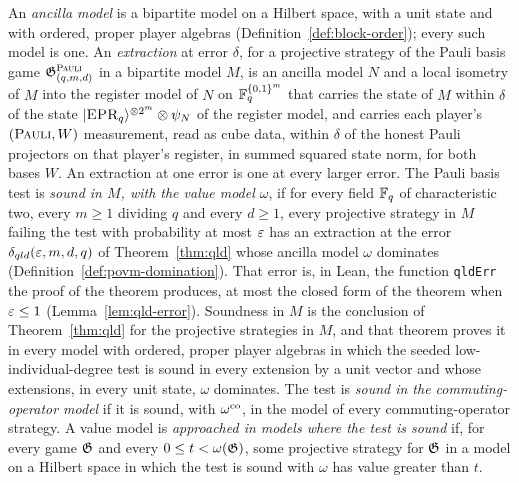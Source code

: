 \begin{definition}
\label{def:qld-sound-in}
\leanok
An \emph{ancilla model} is a bipartite model on a Hilbert space, with a unit state and with ordered,
proper player algebras (Definition~\ref{def:block-order}); every such model is one. An
\emph{extraction} at error $\delta$, for a projective strategy of the Pauli basis game
$\mathfrak{G}^{\textsc{Pauli}}_{(q,m,d)}$ in a bipartite model $M$, is an ancilla model $N$ and a local isometry of
$M$ into the register model of $N$ on $\mathbb{F}_q^{\{0,1\}^m}$ that carries the state of $M$ within
$\delta$ of the state $|\textsc{EPR}_q\rangle^{\otimes 2^m} \otimes \psi_N$ of the register model, and carries each
player's $(\textsc{Pauli}, W)$ measurement, read as cube data, within $\delta$ of the honest Pauli
projectors on that player's register, in summed squared state norm, for both bases $W$. An
extraction at one error is one at every larger error. The Pauli basis test is \emph{sound in $M$,
with the value model $\omega$}, if for every field $\mathbb{F}_q$ of characteristic two, every $m \geq 1$
dividing $q$ and every $d \geq 1$, every projective strategy in $M$ failing the test with
probability at most $\varepsilon$ has an extraction at the error $\delta_{qld}(\varepsilon, m, d, q)$ of
Theorem~\ref{thm:qld} whose ancilla model $\omega$ dominates (Definition~\ref{def:povm-domination}).
That error is, in Lean, the function \texttt{qldErr} the proof of the theorem produces, at most the
closed form of the theorem when $\varepsilon \leq 1$ (Lemma~\ref{lem:qld-error}). Soundness in $M$ is the conclusion of
Theorem~\ref{thm:qld} for the projective strategies in $M$, and that theorem proves it in every
model with ordered, proper player algebras in which the seeded low-individual-degree test is sound
in every extension by a unit vector and whose extensions, in every unit state, $\omega$ dominates.
The test is \emph{sound in the commuting-operator model} if it is sound, with $\omega^{\mathrm{co}}$, in the
model of every commuting-operator strategy. A value model is \emph{approached in models where the
test is sound} if, for every game $\mathfrak{G}$ and every $0 \leq t < \omega(\mathfrak{G})$, some projective
strategy for $\mathfrak{G}$ in a model on a Hilbert space in which the test is sound with $\omega$ has
value greater than $t$.
\end{definition}

